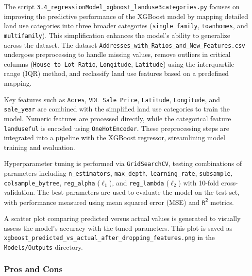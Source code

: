 The script \texttt{3.4\_regressionModel\_xgboost\_landuse3categories.py} focuses on improving the predictive performance of the XGBoost model by mapping detailed land use categories into three broader categories (\texttt{single family}, \texttt{townhomes}, and \texttt{multifamily}). This simplification enhances the model's ability to generalize across the dataset. The dataset \texttt{Addresses\_with\_Ratios\_and\_New\_Features.csv} undergoes preprocessing to handle missing values, remove outliers in critical columns (\texttt{House to Lot Ratio}, \texttt{Longitude}, \texttt{Latitude}) using the interquartile range (IQR) method, and reclassify land use features based on a predefined mapping.

Key features such as \texttt{Acres}, \texttt{VDL Sale Price}, \texttt{Latitude}, \texttt{Longitude}, and \texttt{sale\_year} are combined with the simplified land use categories to train the model. Numeric features are processed directly, while the categorical feature \texttt{landuseful} is encoded using \texttt{OneHotEncoder}. These preprocessing steps are integrated into a pipeline with the XGBoost regressor, streamlining model training and evaluation.

Hyperparameter tuning is performed via \texttt{GridSearchCV}, testing combinations of parameters including \texttt{n\_estimators}, \texttt{max\_depth}, \texttt{learning\_rate}, \texttt{subsample}, \texttt{colsample\_bytree}, \texttt{reg\_alpha} (\(\ell_1\)), and \texttt{reg\_lambda} (\(\ell_2\)) with 10-fold cross-validation. The best parameters are used to evaluate the model on the test set, with performance measured using mean squared error (MSE) and \texttt{R\textsuperscript{2}} metrics.

A scatter plot comparing predicted versus actual values is generated to visually assess the model’s accuracy with the tuned parameters. This plot is saved as \texttt{xgboost\_predicted\_vs\_actual\_after\_dropping\_features.png} in the \texttt{Models/Outputs} directory.

\subsubsection*{Pros and Cons}

